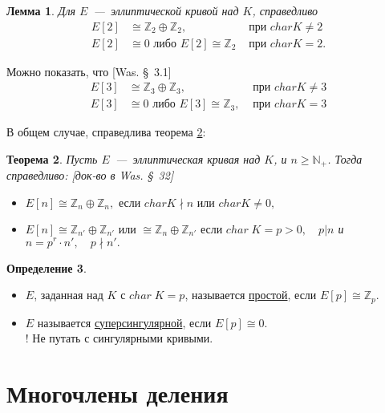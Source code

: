 \documentclass[12pt]{article}
\newcommand{\N}{{{\mathbb N}}}
\newcommand{\Z}{{{\mathbb Z}}}
\newtheorem{theorem}{Теорема}
\newtheorem{lemma}[theorem]{Лемма}
\theoremstyle{definition}
\newtheorem{definition}[theorem]{Определение}
\theoremstyle{definition}
\theoremstyle{definition}
\begin{document}
\begin{lemma}
	\label{lemm_01}
	Для $E$~---~эллиптической кривой над $K$, справедливо
	\begin{align*}
	E\left[ 2 \right] &\cong {\Z_2} \oplus {\Z_2}, &\text{ при }charK \ne 2 \\
	E\left[ 2 \right] &\cong 0 \text{ либо } E\left[ 2 \right] \cong {\Z_2} & \text{ при } char K = 2.
	\end{align*}

\end{lemma}

Можно показать, что [Was. \S~3.1]
    \begin{align*}
    E\left[ 3 \right] &\cong {\Z_3} \oplus {\Z_3}, & {\text{ при }}char K \ne 3 \\
    E\left[ 3 \right] &\cong 0 \text{ либо } E\left[ 3 \right] \cong \Z_3, & {\text{ при }} char K = 3
    \end{align*}

В общем случае, справедлива теорема \ref{theor_02}:

\begin{theorem}
	\label{theor_02}
	Пусть $E$~---~эллиптическая кривая над $K$, и $n \geqslant {\N_+}$. Тогда справедливо: [док-во в Was. \S~32]
	\begin{itemize}
		\item $E\left[ n \right] \cong {\Z_n} \oplus {\Z_n},{\text{ если }} char K \nmid n{\text{ или }}char K \ne 0,$
		
		\item $E\left[ n \right] \cong {\Z_{n'}} \oplus {\Z_{n'}}{\text{ или }} \cong {\Z_n} \oplus {\Z_{n'}}{\text{ если }}char\;K = p > 0,\quad p|n$
		и $n = p^r \cdot n',\quad p \nmid n'.$
	\end{itemize}
\end{theorem}

\begin{definition}
	\label{def_03}
	$ $
	\begin{itemize}
	\item $E$, заданная над $K$ с $char\;K = p$, называется \underline{простой}, если $E[p] \cong {\Z_p}$.

	\item $E$ называется \underline{суперсингулярной}, если $E[p] \cong 0$.\\
	! Не путать с сингулярными кривыми.
	\end{itemize}
\end{definition}

\section{Многочлены деления}
\end{document}
